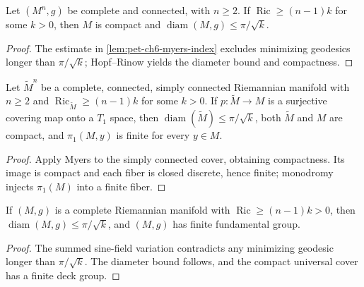 \begin{theorem}
  \label{thm:pet-ch6-myers-ricci-geometric}
  \leanok
  Let $(M^n,g)$ be complete and connected, with $n\ge2$. If
  $\operatorname{Ric}\ge(n-1)k$ for some $k>0$, then $M$ is compact and
  $\operatorname{diam}(M,g)\le\pi/\sqrt k$.
\end{theorem}
\begin{proof}
  \leanok
  \sketch
  The estimate in \cref{lem:pet-ch6-myers-index} excludes minimizing geodesics longer than \(\pi/\sqrt{k}\); Hopf--Rinow yields the diameter bound and compactness.
\end{proof}

\begin{theorem}
  \label{thm:pet-ch6-myers-explicit-cover}
  \leanok
  Let $\widetilde M^n$ be a complete, connected, simply connected Riemannian
  manifold with $n\ge2$ and $\operatorname{Ric}_{\widetilde M}\ge(n-1)k$ for
  some $k>0$. If $p:\widetilde M\to M$ is a surjective covering map onto a
  $T_1$ space, then
  $\operatorname{diam}(\widetilde M)\le\pi/\sqrt k$, both $\widetilde M$ and
  $M$ are compact, and $\pi_1(M,y)$ is finite for every $y\in M$.
\end{theorem}
\begin{proof}
  \leanok
  \sketch
  Apply Myers to the simply connected cover, obtaining compactness. Its image is compact and each fiber is closed discrete, hence finite; monodromy injects \(\pi_1(M)\) into a finite fiber.
\end{proof}

\begin{theorem}
  \label{thm:pet-ch6-myers-ricci-diameter}
  \notready
  If $(M,g)$ is a complete Riemannian manifold with $\operatorname{Ric}\ge(n-1)k>0$,
  then $\operatorname{diam}(M,g)\le\pi/\sqrt k$, and $(M,g)$ has finite fundamental
  group.
\end{theorem}
\begin{proof}
  \sketch
  The summed sine-field variation contradicts any minimizing geodesic longer than \(\pi/\sqrt{k}\). The diameter bound follows, and the compact universal cover has a finite deck group.
\end{proof}


